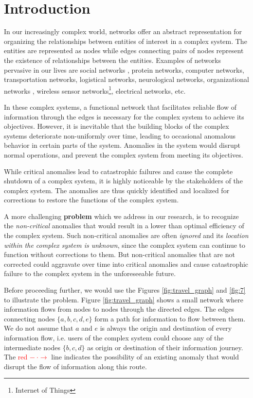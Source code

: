 \documentclass[draft]{sig-alternate}
\begin{document}
\section{Introduction}
\label{sec:intro}

In our increasingly complex world, networks offer an abstract representation for organizing the relationships between entities of interest in a complex system. The entities are represented as nodes while edges connecting pairs of nodes represent the existence of relationships between the entities. Examples of networks pervasive in our lives are social networks \cite{Wu2004}, protein networks, computer networks, transportation networks, logistical networks, neurological networks, organizational networks \cite{Mihm2010}, wireless sensor networks\footnote{Internet of Things}, electrical networks, etc. 

In these complex systems, a functional network that facilitates reliable flow of information through the edges is necessary for the complex system to achieve its objectives. However, it is inevitable that the building blocks of the complex systems deteriorate non-uniformly over time, leading to occasional anomalous behavior in certain parts of the system. Anomalies in the system would disrupt normal operations, and prevent the complex system from meeting its objectives.

While critical anomalies lead to catastrophic failures and cause the complete shutdown of a complex system, it is highly noticeable by the stakeholders of the complex system. The anomalies are thus quickly identified and localized for corrections to restore the functions of the complex system.

A more challenging \textbf{problem} which we address in our research, is to recognize the \emph{non-critical} anomalies that would result in a lower than optimal efficiency of the complex system. Such non-critical anomalies are often \emph{ignored} and its \emph{location within the complex system is unknown}, since the complex system can continue to function without corrections to them. But non-critical anomalies that are not corrected could aggravate over time into critical anomalies and cause catastrophic failure to the complex system in the unforeseeable future. 

Before proceeding further, we would use the Figures \ref{fig:travel_graph} and \ref{fig:7} to illustrate the problem. Figure \ref{fig:travel_graph} shows a small network where information flows from nodes to nodes through the directed edges. The edges connecting nodes $\{a, b, c, d, e\}$ form a path for information to flow between them. We do not assume that $a$ and $e$ is always the origin and destination of every information flow, i.e. users of the complex system could choose any of the intermediate nodes $\{b, c, d\}$ as origin or destination of their information journey. The \textcolor{red}{red $- ~ \cdot \rightarrow$} line indicates the possibility of an existing anomaly that would disrupt the flow of information along this route.
\end{document}
